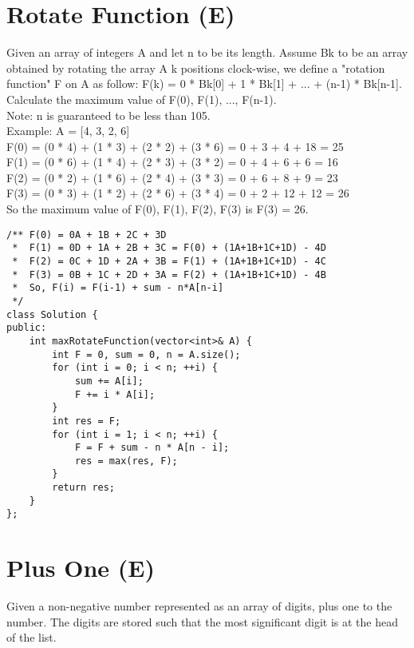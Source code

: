 \section{Rotate Function (E)}
Given an array of integers A and let n to be its length. Assume Bk to be an array obtained by rotating the array A k positions clock-wise, we define a "rotation function" F on A as follow:
F(k) = 0 * Bk[0] + 1 * Bk[1] + ... + (n-1) * Bk[n-1].\\

Calculate the maximum value of F(0), F(1), ..., F(n-1).\\

Note:
n is guaranteed to be less than 105.\\

Example:
A = [4, 3, 2, 6]\\
F(0) = (0 * 4) + (1 * 3) + (2 * 2) + (3 * 6) = 0 + 3 + 4 + 18 = 25\\
F(1) = (0 * 6) + (1 * 4) + (2 * 3) + (3 * 2) = 0 + 4 + 6 + 6 = 16\\
F(2) = (0 * 2) + (1 * 6) + (2 * 4) + (3 * 3) = 0 + 6 + 8 + 9 = 23\\
F(3) = (0 * 3) + (1 * 2) + (2 * 6) + (3 * 4) = 0 + 2 + 12 + 12 = 26\\
So the maximum value of F(0), F(1), F(2), F(3) is F(3) = 26.\\

\begin{lstlisting}
/** F(0) = 0A + 1B + 2C + 3D
 *  F(1) = 0D + 1A + 2B + 3C = F(0) + (1A+1B+1C+1D) - 4D
 *  F(2) = 0C + 1D + 2A + 3B = F(1) + (1A+1B+1C+1D) - 4C
 *  F(3) = 0B + 1C + 2D + 3A = F(2) + (1A+1B+1C+1D) - 4B
 *  So, F(i) = F(i-1) + sum - n*A[n-i]
 */
class Solution {
public:
    int maxRotateFunction(vector<int>& A) {
        int F = 0, sum = 0, n = A.size();
        for (int i = 0; i < n; ++i) {
            sum += A[i];
            F += i * A[i];
        }
        int res = F;
        for (int i = 1; i < n; ++i) {
            F = F + sum - n * A[n - i];
            res = max(res, F);
        }
        return res;
    }
};
\end{lstlisting}


\section{Plus One (E)}
Given a non-negative number represented as an array of digits, plus one to the number. The digits are stored such that the most significant digit is at the head of the list. \\

